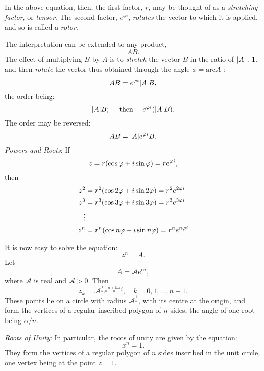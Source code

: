 \documentclass[letter,oneside]{memoir}
\begin{document}
In the above equation, then, the first factor, $r$, may be thought of as a \emph{stretching factor}, or \emph{tensor}. The second factor, $e^{\phi i}$, \emph{rotates} the vector to which it is applied, and so is called a \emph{rotor}. 

The interpretation can be extended to any product,
\[
AB
.\] The effect of multiplying $B$ by $A$ is to \emph{stretch} the vector $B$ in the ratio of $\abs*{A} :1$, and then \emph{rotate} the vector thus obtained through the angle $\phi =\text{arc} A$ :
\[
AB=e^{\phi i}\abs*{A} B
,\] the order being:
\[
	\abs*{A} B; \quad \text{ then } \quad e^{\phi i}\pbr*{\abs*{A} B} 
.\] The order may be reversed:
\[
AB=\abs*{A} e^{\phi i}B
.\] \emph{Powers and Roots}: If
\[
	z=r\pbr*{\cos \phi +i\sin \phi } =r e^{\phi i}
,\] then
\begin{align*}
	z^2&=r^2\pbr*{\cos 2\phi +i\sin 2\phi } =r^2 e^{2\phi i}\\
	z^3&=r^3\pbr*{\cos 3\phi +i\sin 3\phi } =r^3e^{3\phi i}\\
	\vdots&\\
	z^n&= r^n \pbr*{\cos n\phi +i\sin n\phi } =r^ne^{n\phi i}
\end{align*}

It is now easy to solve the equation:
\[
z^n=A
.\] Let
\[
	A=\mathcal{A} e^{\alpha i}
,\] where $\mathcal{A} $ is real and $\mathcal{A} >0$. Then
\[
	z_k=\mathcal{A} ^{\frac{1}{n}} e^{\frac{\alpha +2k\pi }{n} i}, \quad k=0,1, \dots , n-1
.\] These points lie on a circle with radius $\mathcal{A}^{\frac{1}{n}}$, with its centre at the origin, and form the vertices of a regular inscribed polygon of $n$ sides, the angle of one root being $\alpha /n$. 

\emph{Roots of Unity}: In particular, the roots of unity are given by the equation:
\[
x^n=1
.\] They form the vertices of a regular polygon of $n$ sides inscribed in the unit circle, one vertex being at the point $z=1$.

\newdimen\R
\R=0.8cm
\begin{figure}[htbp]
\centering
{}
\end{figure}
\end{document}

